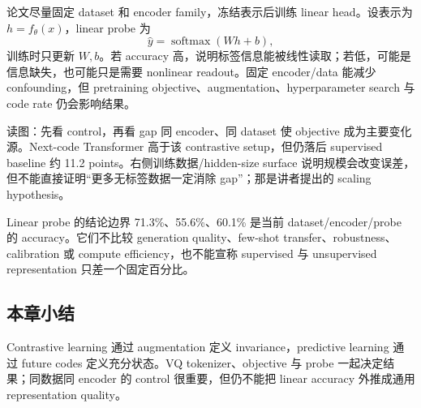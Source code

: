 论文尽量固定 dataset 和 encoder family，冻结表示后训练 linear head。设表示为 $h=f_\theta(x)$，linear probe 为
\[
\hat{y}=\operatorname{softmax}(Wh+b),
\]
训练时只更新 $W,b$。若 accuracy 高，说明标签信息能被线性读取；若低，可能是信息缺失，也可能只是需要 nonlinear readout。固定 encoder/data 能减少 confounding，但 pretraining objective、augmentation、hyperparameter search 与 code rate 仍会影响结果。



\begin{knowledgebox}{读图：先看 control，再看 gap}
同 encoder、同 dataset 使 objective 成为主要变化源。Next-code Transformer 高于该 contrastive setup，但仍落后 supervised baseline 约 11.2 points。右侧训练数据/hidden-size surface 说明规模会改变误差，但不能直接证明“更多无标签数据一定消除 gap”；那是讲者提出的 scaling hypothesis。
\end{knowledgebox}

\begin{warningbox}{Linear probe 的结论边界}
71.3\%、55.6\%、60.1\% 是当前 dataset/encoder/probe 的 accuracy。它们不比较 generation quality、few-shot transfer、robustness、calibration 或 compute efficiency，也不能宣称 supervised 与 unsupervised representation 只差一个固定百分比。
\end{warningbox}


\subsection{本章小结}

Contrastive learning 通过 augmentation 定义 invariance，predictive learning 通过 future codes 定义充分状态。VQ tokenizer、objective 与 probe 一起决定结果；同数据同 encoder 的 control 很重要，但仍不能把 linear accuracy 外推成通用 representation quality。

